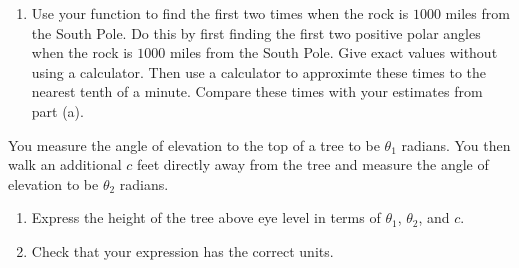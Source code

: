 \documentclass{ximera}
\begin{document}
\begin{question}
\begin{enumerate}

\item Use  your function to find the first two times when the rock is $1000$ miles from the South Pole. Do this by first finding the first two positive polar angles when the rock is $1000$ miles from the South Pole. Give exact values without using a calculator. Then use a calculator to approximte these times to the nearest tenth of a minute. Compare these times with your estimates from part (a).



\end{enumerate}
\end{question}




\begin{question} \label{QPPLFKEbd}
You measure the angle of elevation to the top of a tree to be $\theta_1$ radians. You then walk an additional $c$ feet directly away from the tree and measure the angle of elevation to be $\theta_2$ radians. 
\begin{enumerate}
\item Express the height of the tree above eye level in terms of $\theta_1$, $\theta_2$, and $c$.

\item Check that your expression has the correct units.
\end{enumerate} 
\end{question}
\end{document}
